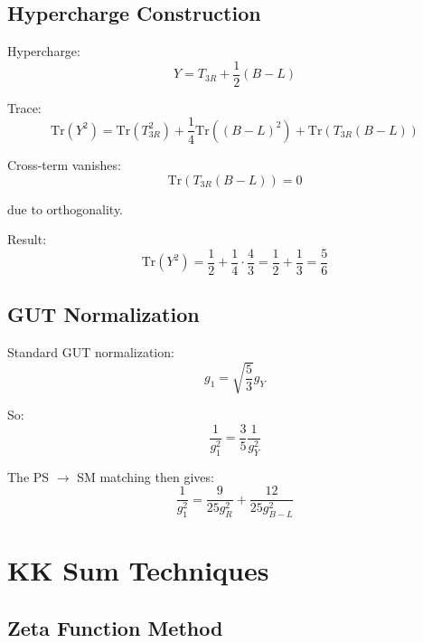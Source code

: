 \documentclass[11pt,a4paper]{article}
\begin{document}
\subsection{Hypercharge Construction}
\label{app:hypercharge-construct}

Hypercharge:
\begin{equation}
\label{eq:Y-construct}
Y = T_{3R} + \frac{1}{2}(B-L)
\end{equation}

Trace:
\begin{equation}
\label{eq:Y-trace-calc}
\text{Tr}(Y^2) = \text{Tr}(T_{3R}^2) + \frac{1}{4}\text{Tr}((B-L)^2) + \text{Tr}(T_{3R}(B-L))
\end{equation}

Cross-term vanishes:
\begin{equation}
\label{eq:cross-vanish}
\text{Tr}(T_{3R}(B-L)) = 0
\end{equation}

due to orthogonality.

Result:
\begin{equation}
\label{eq:Y-trace-final}
\text{Tr}(Y^2) = \frac{1}{2} + \frac{1}{4} \cdot \frac{4}{3} = \frac{1}{2} + \frac{1}{3} = \frac{5}{6}
\end{equation}

\subsection{GUT Normalization}
\label{app:gut-norm}

Standard GUT normalization:
\begin{equation}
\label{eq:gut-norm-def}
g_1 = \sqrt{\frac{5}{3}} g_Y
\end{equation}

So:
\begin{equation}
\label{eq:gut-norm-inverse}
\frac{1}{g_1^2} = \frac{3}{5}\frac{1}{g_Y^2}
\end{equation}

The PS $\to$ SM matching then gives:
\begin{equation}
\label{eq:ps-sm-g1}
\frac{1}{g_1^2} = \frac{9}{25 g_R^2} + \frac{12}{25 g_{B-L}^2}
\end{equation}

\section{KK Sum Techniques}
\label{app:kk-sum}

\subsection{Zeta Function Method}
\label{app:zeta-method}
\end{document}
